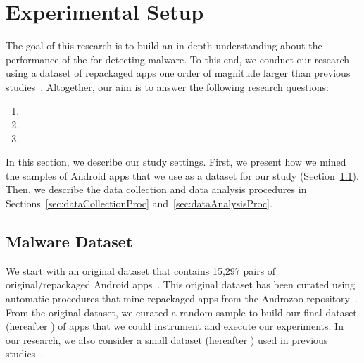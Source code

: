 \section{Experimental Setup}\label{sec:experimentalSetup}

The goal of this research is to build an in-depth understanding about
the performance of the \mas for detecting malware. To this
end, we conduct our research using a dataset of repackaged apps one order of magnitude
larger than previous studies~\cite{DBLP:conf/wcre/BaoLL18,DBLP:journals/jss/CostaMMSSBNR22}. Altogether, our
aim is to answer the following research questions:

\begin{enumerate}[(RQ1)]
\item \rqa
\item \rqc
\item \rqd  
\end{enumerate}

In this section, we describe our study settings. First, we present how we mined the samples of Android apps that we
use as a dataset for our study (Section~\ref{sec:dataset}).  Then, we describe the data
collection and data analysis procedures in Sections~\ref{sec:dataCollectionProc} and~\ref{sec:dataAnalysisProc}.


\subsection{Malware Dataset}\label{sec:dataset}

We start with an original dataset that contains 15,297 pairs of original/repackaged Android apps~\cite{DBLP:journals/tse/LiBK21}. This original dataset
has been curated using automatic procedures that mine repackaged apps from the Androzoo repository~\cite{DBLP:conf/msr/AllixBKT16}.
From the original dataset, we curated a random sample to build our final dataset (hereafter \cds) of \apps apps that we could instrument
and execute our experiments. In our research, we also consider a small dataset (hereafter \sds) used in previous studies~\cite{DBLP:conf/wcre/BaoLL18,DBLP:journals/jss/CostaMMSSBNR22}.




